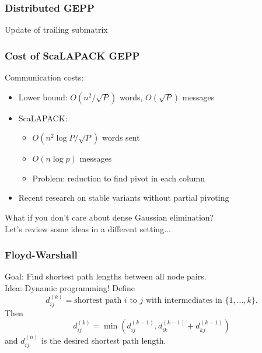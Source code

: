\documentclass{beamer}
\begin{document}
\begin{frame}
  \frametitle{Distributed GEPP}
  
  \begin{center}
  
    Update of trailing submatrix
  \end{center}
\end{frame}


\begin{frame}
  \frametitle{Cost of ScaLAPACK GEPP}
  
  Communication costs:
  \begin{itemize}
  \item Lower bound: $O(n^2/\sqrt{P})$ words, $O(\sqrt{P})$ messages
  \item ScaLAPACK: 
    \begin{itemize}
    \item $O(n^2 \log P / \sqrt{P})$ words sent
    \item {\color{red} $O(n \log p)$} messages
    \item Problem: reduction to find pivot in each column
    \end{itemize}
  \item Recent research on stable variants without partial pivoting
  \end{itemize}
\end{frame}


\begin{frame}
  \begin{center}
  What if you don't care about dense Gaussian elimination? \\
  Let's review some ideas in a different setting...
  \end{center}
\end{frame}


\begin{frame}
  \frametitle{Floyd-Warshall}
  
  Goal: Find shortest path lengths between all node pairs. \\[5mm]
  Idea: Dynamic programming!  Define
  \[
    d_{ij}^{(k)} =
    \mbox{shortest path $i$ to $j$ with intermediates in $\{1, \ldots, k\}$}.
  \]
  Then
  \[
    d_{ij}^{(k)} = 
    \min\left( d_{ij}^{(k-1)}, d_{ik}^{(k-1)} + d_{kj}^{(k-1)} \right)
  \]
  and $d_{ij}^{(n)}$ is the desired shortest path length.
\end{frame}
\end{document}
